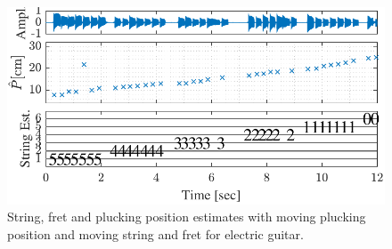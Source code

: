 %
\begin{figure}[t]
\centering
   \includegraphics[width=.9\linewidth]{img/tablature_constant_note25_LSD}\vspace{-2mm}
   \caption{String, fret and plucking position estimates with moving plucking position and moving string and fret for electric guitar.}
   \label{fig:pluck_position_fixed_tabs} 
\end{figure}